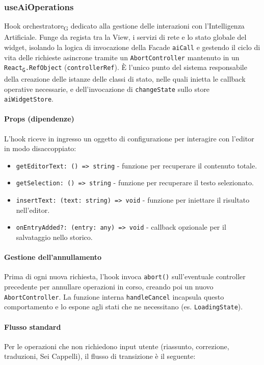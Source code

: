 \documentclass[11pt,a4paper]{article}
\newcommand{\gls}[1]{#1\textsubscript{G}}
\begin{document}
\subsubsection{useAiOperations}
Hook \gls{orchestratore} dedicato alla gestione delle interazioni con l'Intelligenza Artificiale. Funge da regista tra la View, i servizi di rete e lo stato globale del widget, isolando la logica di invocazione della Facade \texttt{aiCall} e gestendo il ciclo di vita delle richieste asincrone tramite un \texttt{AbortController} mantenuto in un \texttt{\gls{React}.RefObject} (\texttt{controllerRef}). È l'unico punto del sistema responsabile della creazione delle istanze delle classi di stato, nelle quali inietta le callback operative necessarie, e dell'invocazione di \texttt{changeState} sullo store \texttt{aiWidgetStore}.

\paragraph{Props (dipendenze)}
L'hook riceve in ingresso un oggetto di configurazione per interagire con l'editor in modo disaccoppiato:
\begin{itemize}
    \item \texttt{getEditorText: () => string} - funzione per recuperare il contenuto totale.
    \item \texttt{getSelection: () => string} - funzione per recuperare il testo selezionato.
    \item \texttt{insertText: (text: string) => void} - funzione per iniettare il risultato nell'editor.
    \item \texttt{onEntryAdded?: (entry: any) => void} - callback opzionale per il salvataggio nello storico.
\end{itemize}

\paragraph{Gestione dell'annullamento}
Prima di ogni nuova richiesta, l'hook invoca \texttt{abort()} sull'eventuale controller precedente per annullare operazioni in corso, creando poi un nuovo \texttt{AbortController}. La funzione interna \texttt{handleCancel} incapsula questo comportamento e lo espone agli stati che ne necessitano (es. \texttt{LoadingState}).

\paragraph{Flusso standard}
Per le operazioni che non richiedono input utente (riassunto, correzione, traduzioni, Sei Cappelli), il flusso di transizione è il seguente:
\end{document}
